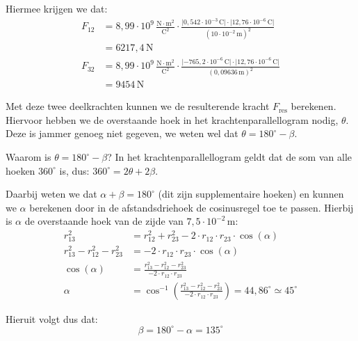\documentclass{ximera}
\begin{document}
\begin{example}[foldable=true,title={Voorbeeld: Drie ladingen niet op een lijn}]
\begin{solution}
        Hiermee krijgen we dat:
        \begin{align*}
            F_{12} &= 8{,}99 \cdot 10^9 \, \mathrm{\frac{N\cdot m^2}{C^2}} \cdot \frac{\lvert 0{,}542 \cdot 10^{-3} \, \mathrm{C} \rvert \cdot \lvert 12{,}76 \cdot 10^{-6} \, \mathrm{C}\rvert}{(10 \cdot 10^{-2} \, \mathrm{m})^{2}} \\
            &= 6217{,}4 \, \mathrm{N} \\
            F_{32} &= 8{,}99 \cdot 10^9 \, \mathrm{\frac{N\cdot m^2}{C^2}} \cdot \frac{\lvert -765{,}2 \cdot 10^{-6} \, \mathrm{C}\rvert \cdot \lvert 12{,}76 \cdot 10^{-6} \, \mathrm{C}\rvert}{(0{,}09636 \, \mathrm{m})^{2}} \\
            &= 9454 \, \mathrm{N}
        \end{align*}    
        
        Met deze twee deelkrachten kunnen we de resulterende kracht $F_{\text{res}}$ berekenen. Hiervoor hebben we de overstaande hoek in het krachtenparallellogram nodig, $\theta$. Deze is jammer genoeg niet gegeven, we weten wel dat $\theta = 180^\circ - \beta$. 
        
        \begin{hint}
            Waarom is $\theta = 180^\circ - \beta$? In het krachtenparallellogram geldt dat de som van alle hoeken $360^\circ$ is, dus: $360^\circ = 2\theta + 2\beta$.
        \end{hint}

        Daarbij weten we dat $\alpha + \beta = 180^\circ$ (dit zijn supplementaire hoeken) en kunnen we $\alpha$ berekenen door in de afstandsdriehoek de cosinusregel toe te passen. Hierbij is $\alpha$ de overstaande hoek van de zijde van $7{,}5 \cdot 10^{-2} \, \mathrm{m}$:
        \begin{align*}
            r^{2}_{13} &= r^{2}_{12} + r^{2}_{23} - 2 \cdot r_{12} \cdot r_{23} \cdot \cos(\alpha) \\
            r^{2}_{13} - r^{2}_{12} - r^{2}_{23} &= -2 \cdot r_{12} \cdot r_{23} \cdot \cos(\alpha) \\
            \cos(\alpha) &= \frac{r^{2}_{13} - r^{2}_{12} - r^{2}_{23}}{-2 \cdot r_{12} \cdot r_{23}} \\
            \alpha &= \cos^{-1} \left( \frac{r^{2}_{13} - r^{2}_{12} - r^{2}_{23}}{-2 \cdot r_{12} \cdot r_{23}} \right) = 44{,}86^\circ \simeq 45^\circ
        \end{align*}
        
        Hieruit volgt dus dat:
        \begin{equation*}
            \beta = 180^\circ - \alpha = 135^\circ
        \end{equation*}
        

\end{solution}
\end{example}
\end{document}
